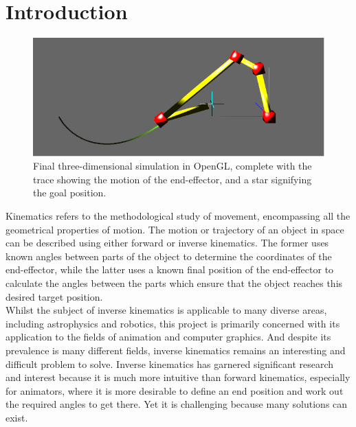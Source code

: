 \documentclass[paper=a4, fontsize=11pt]{scrartcl} %
\numberwithin{equation}{section} %
\numberwithin{figure}{section} %
\numberwithin{table}{section} %
\begin{document}
\section{Introduction}
\begin{figure}
\centering
\includegraphics[scale=0.4]{chain3Dexamplev2}
\caption{Final three-dimensional simulation in OpenGL, complete with the trace showing the motion of the end-effector, and a star signifying the goal position.}
\label{fig:3Dpicture}
\end{figure}

Kinematics refers to the methodological study of movement, encompassing all the geometrical properties of motion. The motion or trajectory of an object in space can be described using either forward or inverse kinematics. The former uses known angles between parts of the object to determine the coordinates of the end-effector, while the latter uses a known final position of the end-effector to calculate the angles between the parts which ensure that the object reaches this desired target position. \\

Whilst the subject of inverse kinematics is applicable to many diverse areas, including astrophysics and robotics, this project is primarily concerned with its application to the fields of animation and computer graphics. And despite its prevalence is many different fields, inverse kinematics remains an interesting and difficult problem to solve. Inverse kinematics has garnered significant research and interest because it is much more intuitive than forward kinematics, especially for animators, where it is more desirable to define an end position and work out the required angles to get there. Yet it is challenging because many solutions can exist. \\
\end{document}
